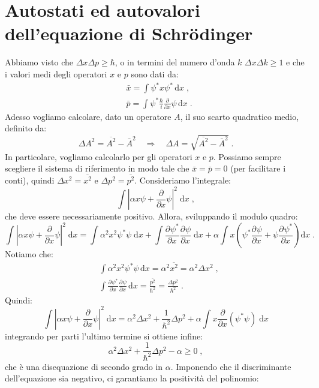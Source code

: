 \documentclass[12pt,a4paper]{report}
\theoremstyle{definition}
\newcommand{\pdev}[3][]{\frac{\partial^{#1} #2}{\partial #3^{#1}}}
\numberwithin{equation}{section}
\newcommand{\diff}[1][]{\mathrm{d}#1}
\begin{document}
\section{Autostati ed autovalori dell'equazione di Schrödinger}
Abbiamo visto che $\Delta x\Delta p\ge \hbar$, o in termini del numero d'onda $k$ $\Delta x\Delta k\ge 1$ e che i valori medi degli 
operatori $x$ e $p$ sono dati da:
\begin{align*}
&\bar{x}=\int\psi^* x\psi^*\,\diff{x}\;, \\
&\bar{p}=\int\psi^*\frac{\hbar}{i}\frac{\partial}{\partial x}\psi\,\diff{x}\;.
\end{align*}
Adesso vogliamo calcolare, dato un operatore $A$, il suo scarto quadratico medio, definito da:
$$
\Delta A^2=\overline{A^2}-\bar{A}^2\quad  \Longrightarrow\quad \Delta A=\sqrt{\overline{A^2}-\bar{A}^2}\;.
$$
In particolare, vogliamo calcolarlo per gli operatori $x$ e $p$. Possiamo sempre scegliere il sistema di riferimento in modo tale 
che $\bar{x}=\bar{p}=0$ (per facilitare i conti), quindi $\Delta x^2=\overline{x^2}$ e $\Delta p^2=\overline{p^2}$. Consideriamo 
l'integrale:
\begin{equation}
 \int \left|\alpha x\psi+\frac{\partial}{\partial x}\psi\right|^2\;\diff{x}\;,
\end{equation}
che deve essere necessariamente positivo. Allora, sviluppando il modulo quadro:
$$
 \int \left|\alpha x\psi+\frac{\partial}{\partial x}\psi\right|^2\;\diff{x} = \int \alpha^2 x^2 \psi^*\psi\;\diff{x}+\int \pdev{\psi^*}
 {x}\pdev{\psi}{x}\;\diff{x}+\alpha\int x\left(\psi^*\pdev{\psi}{x}+\psi\pdev{\psi^*}{x}\right)\diff{x}\;.
 $$
 Notiamo che:
 \begin{align}
 &\int\alpha^2x^2\psi^*\psi\,\diff{x}=\alpha^2\overline{x^2}=\alpha^2\Delta x^2\;, \\
 &\int \pdev{\psi^*}{x}\pdev{\psi}{x}\,\diff{x}=\frac{\overline{p^2}}{\hbar^2}=\frac{\Delta p^2}{\hbar^2}\;.
 \end{align}
Quindi:
$$
 \int \left|\alpha x\psi+\frac{\partial}{\partial x}\psi\right|^2\;\diff{x}=\alpha^2\Delta x^2+\frac{1}{\hbar^2}\Delta p^2+\alpha\int x
 \frac{\partial}{\partial x}(\psi^*\psi)\;\diff{x}
 $$
 integrando per parti l'ultimo termine si ottiene infine:
 \begin{equation}
  \alpha^2\Delta x^2+\frac{1}{\hbar^2}\Delta p^2-\alpha\ge 0\;,
 \end{equation}
 che è una disequazione di secondo grado in $\alpha$. Imponendo che il discriminante dell'equazione sia negativo, ci garantiamo la 
 positività del polinomio:
\end{document}
